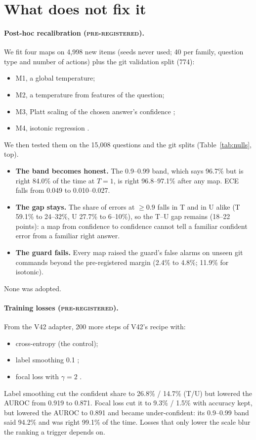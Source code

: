 \documentclass[11pt]{article}
\newcommand{\prereg}{\textsc{pre-registered}}
\begin{document}
\section{What does not fix it}\label{sec:nulls}
\paragraph{Post-hoc recalibration (\prereg).} We fit four maps on 4,998 new items (seeds never used; 40 per family,
question type and number of actions) plus the git validation split (774):
\begin{itemize}
  \item M1, a global temperature;
  \item M2, a temperature from features of the question;
  \item M3, Platt scaling of the chosen answer's confidence \cite{platt1999};
  \item M4, isotonic regression \cite{zadrozny2002}.
\end{itemize}
We then tested them on the 15,008 questions and the git splits (Table~\ref{tab:nulls}, top).
\begin{itemize}
  \item \textbf{The band becomes honest.} The 0.9--0.99 band, which says 96.7\% but is right 84.0\% of the time at
  $T{=}1$, is right 96.8--97.1\% after any map. ECE \cite{naeini2015} falls from 0.049 to 0.010--0.027.
  \item \textbf{The gap stays.} The share of errors at $\ge 0.9$ falls in T and in U alike (T 59.1\% to 24--32\%, U
  27.7\% to 6--10\%), so the T--U gap remains (18--22 points): a map from confidence to confidence cannot tell a
  familiar confident error from a familiar right answer.
  \item \textbf{The guard fails.} Every map raised the guard's false alarms on unseen git commands beyond the
  pre-registered margin (2.4\% to 4.8\%; 11.9\% for isotonic).
\end{itemize}
None was adopted.

\paragraph{Training losses (\prereg).} From the V42 adapter, 200 more steps of V42's recipe with:
\begin{itemize}
  \item cross-entropy (the control);
  \item label smoothing 0.1 \cite{szegedy2016,muller2019};
  \item focal loss with $\gamma{=}2$ \cite{lin2017,mukhoti2020}.
\end{itemize}
Label smoothing cut the confident share to 26.8\% / 14.7\% (T/U) but lowered the AUROC from 0.919 to 0.871. Focal loss
cut it to 9.3\% / 1.5\% with accuracy kept, but lowered the AUROC to 0.891 and became under-confident: its 0.9--0.99
band said 94.2\% and was right 99.1\% of the time. Losses that only lower the scale blur the ranking a trigger depends on.
\end{document}
